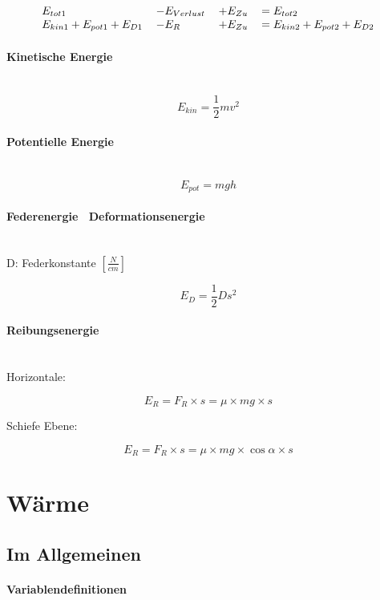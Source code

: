 \documentclass[a4paper,10pt]{article}
\newcommand{\lbparagraph}[1]{\paragraph{#1}\mbox{}\\}
\begin{document}
\begin{equation}
\begin{tabular}{l l l l}
    $E_{tot1}$ & $- E_{Verlust}$ & $+ E_{Zu}$ & $= E_{tot2}$  \\
    $E_{kin1} + E_{pot1} + E_{D1}$ & $- E_R$ & $+ E_{Zu}$ & $= E_{kin2} + E_{pot2} + E_{D2}$
\end{tabular}
\end{equation}

\lbparagraph{Kinetische Energie}

\begin{equation}
    E_{kin} = \frac{1}{2}mv^2
\end{equation}

\lbparagraph{Potentielle Energie}

\begin{equation}
    E_{pot} = mgh
\end{equation}

\lbparagraph{Federenergie \ Deformationsenergie}

D: Federkonstante $[\frac{N}{cm}]$

\begin{equation}
    E_D = \frac{1}{2}Ds^2
\end{equation}

\lbparagraph{Reibungsenergie}

Horizontale:

\begin{equation}
    E_R = F_R \times s = \mu \times mg \times s
\end{equation}

Schiefe Ebene:

\begin{equation}
    E_R = F_R \times s = \mu \times mg \times \cos{\alpha} \times s
\end{equation}

\section{Wärme}

\subsection{Im Allgemeinen}

\lbparagraph{Variablendefinitionen}
\end{document}
